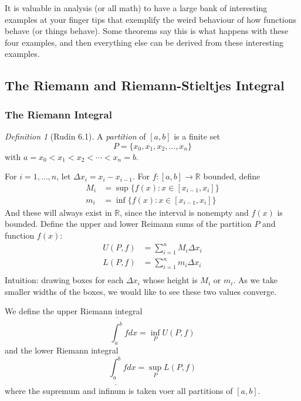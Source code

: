 \documentclass{article}
\theoremstyle{plain}
\theoremstyle{remark}
\newtheorem{definition}{Definition}
\newcommand{\R}{{\mathbb R}}
\begin{document}
It is valuable in analysis (or all math) to have a large bank of
interesting examples at your finger tips
that exemplify the weird behaviour of how functions behave (or things behave).
Some theorems say this is what happens with these four examples,
and then everything else can be derived from these interesting examples.

\subsection{The Riemann and Riemann-Stieltjes Integral}
\subsubsection{The Riemann Integral}
\begin{definition}[Rudin 6.1]
	A \emph{partition} of $[a,b]$ is a finite set
	\[
		P = \{x_0, x_1, x_2, \dots, x_n\}
	\]
	with $a = x_0 < x_1 < x_2 < \cdots < x_n = b$.
\end{definition}
For $i = 1, \dots, n$, let $\Delta x_i = x_i - x_{i-1}$.
For $f \colon [a,b] \to \R$ bounded, define
\begin{align*}
	M_i &= \sup\{f(x) \colon x \in [x_{i-1}, x_i]\}\\
	m_i &= \inf\{f(x) \colon x \in [x_{i-1}, x_i]\}
\end{align*}
And these will always exist in $\R$, since the interval is nonempty
and $f(x)$ is bounded.
Define the upper and lower Reimann sums of the partition $P$ and function $f(x)$:
\begin{align*}
	U(P,f) &= \sum_{i=1}^n M_i \Delta x_i\\
	L(P,f) &= \sum_{i=1}^n m_i \Delta x_i\\
\end{align*}
Intuition: drawing boxes for each $\Delta x_i$ whose height is
$M_i$ or $m_i$.
As we take smaller widths of the boxes, we would like to see these two values converge.

We define the upper Riemann integral
\[
	\overline{\int_a^b}fdx = \inf_P U(P,f)
\]
and the lower Riemann integral
\[
	\underline{\int_a^b}fdx = \sup_P L(P,f)
\]
where the supremum and infinum is taken voer all partitions of $[a,b]$. 
\end{document}
